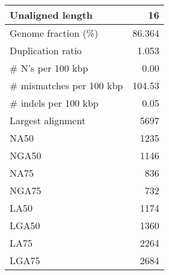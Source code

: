 \documentclass[12pt,a4paper]{article}
\begin{document}
\begin{table}[ht]
\begin{center}
\begin{tabular}{|l*{1}{|r}|}
Unaligned length & 16 \\ \hline
Genome fraction (\%) & 86.364 \\ \hline
Duplication ratio & 1.053 \\ \hline
\# N's per 100 kbp & 0.00 \\ \hline
\# mismatches per 100 kbp & 104.53 \\ \hline
\# indels per 100 kbp & 0.05 \\ \hline
Largest alignment & 5697 \\ \hline
NA50 & 1235 \\ \hline
NGA50 & 1146 \\ \hline
NA75 & 836 \\ \hline
NGA75 & 732 \\ \hline
LA50 & 1174 \\ \hline
LGA50 & 1360 \\ \hline
LA75 & 2264 \\ \hline
LGA75 & 2684 \\ \hline
\end{tabular}
\end{center}
\end{table}
\end{document}
